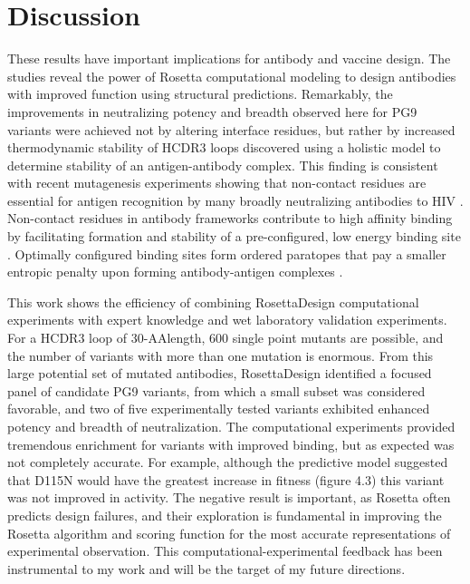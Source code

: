 
\section{Discussion}
These results have important implications for antibody and vaccine design. The studies reveal the power of Rosetta computational modeling to design antibodies with improved function using structural predictions. Remarkably, the improvements in neutralizing potency and breadth observed here for PG9 variants were achieved not by altering interface residues, but rather by increased thermodynamic stability of HCDR3 loops discovered using a holistic model to determine stability of an antigen-antibody complex. This finding is consistent with recent mutagenesis experiments showing that non-contact residues are essential for antigen recognition by many broadly neutralizing antibodies to HIV \citep{Klein:2013iz}. Non-contact residues in antibody frameworks contribute to high affinity binding by facilitating formation and stability of a pre-configured, low energy binding site \citep{Willis:2013dd,Manivel:2000wk,Marlow:2010jl,Wedemayer:1997wn,Schmidt:2013ka}. Optimally configured binding sites form ordered paratopes that pay a smaller entropic penalty upon forming antibody-antigen complexes \citep{Marlow:2010jl}. 

This work shows the efficiency of combining RosettaDesign computational experiments with expert knowledge and wet laboratory validation experiments. For a HCDR3 loop of 30-AAlength, 600 single point mutants are possible, and the number of variants with more than one mutation is enormous. From this large potential set of mutated antibodies, RosettaDesign identified a focused panel of candidate PG9 variants, from which a small subset was considered favorable, and two of five experimentally tested variants exhibited enhanced potency and breadth of neutralization. The computational experiments provided tremendous enrichment for variants with improved binding, but as expected was not completely accurate. For example, although the predictive model suggested that D115N would have the greatest increase in fitness (figure 4.3) this variant was not improved in activity. 
The negative result is important, as Rosetta often predicts design failures, and their exploration is fundamental in improving the Rosetta algorithm and scoring function for the most accurate representations of experimental observation. This computational-experimental feedback has been instrumental to my work and will be the target of my future directions. 


